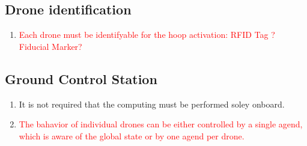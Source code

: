 \subsection{Drone identification}
\begin{enumerate}
	\item{\textcolor{red}{Each drone must be identifyable for the hoop activation: RFID Tag ? Fiducial Marker? }}
\end{enumerate}

\subsection{Ground Control Station}
\begin{enumerate}
	\item{It is not required that the computing must be performed soley onboard.}
	\item{\textcolor{red}{The bahavior of individual drones can be either controlled by a single agend, which is aware of the global state or by one agend per drone.}}
\end{enumerate}